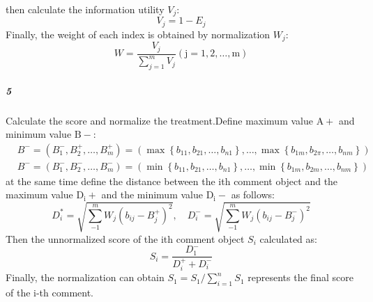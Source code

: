 \documentclass[../mcmpaper]{subfiles}
\begin{document}
    then calculate the information utility $V_j$:
    \begin{equation}
    V_j=1-E_{j}
    \end{equation}
    Finally, the weight of each index is obtained by normalization $W_j$:
    \begin{equation}
    W=\frac{V_{j}}{\sum_{j=1}^{m} V_{j}}(\mathrm{j}=1,2, \ldots, \mathrm{m})
    \end{equation}
    \subparagraph{5}
    Calculate the score and normalize the treatment.Define maximum value $\mathrm{A}+{}$ and minimum value $\mathrm{B}-$:
    \begin{equation}
    \begin{aligned}
    &B^{-}=\left(B_{1}^{-}, B_{2}^{+}, \ldots, B_{m}^{+}\right)=\left(\max \left\{b_{11}, b_{21}, \ldots, b_{n 1}\right\}, \ldots, \max \left\{b_{1 m}, b_{2 \pi}, \ldots, b_{n m}\right\}\right) \\
    &B^{-}=\left(B_{1}^{-}, B_{2}^{-}, \ldots, B_{m}^{-}\right)=\left(\min \left\{b_{11}, b_{21}, \ldots, b_{n 1}\right\}, \ldots, \min \left\{b_{1 m}, b_{2 m}, \ldots, b_{n m}\right\}\right)
    \end{aligned}
    \end{equation}
    at the same time define the distance between the ith comment object and the maximum value $\mathrm{D_i}+$ and the minimum value $\mathrm{D_i}-$ as follows:
    \begin{equation}
    D_{i}^{*}=\sqrt{\sum_{-1}^{m} W_{j}\left(b_{i j}-B_{j}^{+}\right)^{2}}, \quad D_{i}^{-}=\sqrt{\sum_{-1}^{m} W_{j}\left(b_{i j}-B_{j}^{-}\right)^{2}}
    \end{equation}
    Then the unnormalized score of the ith comment object $S_i$ calculated as:
    \begin{equation}
    S_{i}=\frac{D_{1}^{-}}{D_{i}^{+}+D_{i}^{-}}
    \end{equation}
    Finally, the normalization can obtain $S_{1}=S_{1} / \sum_{i=1}^{n} S_{1}$ represents the final score of the i-th comment.
\end{document}
